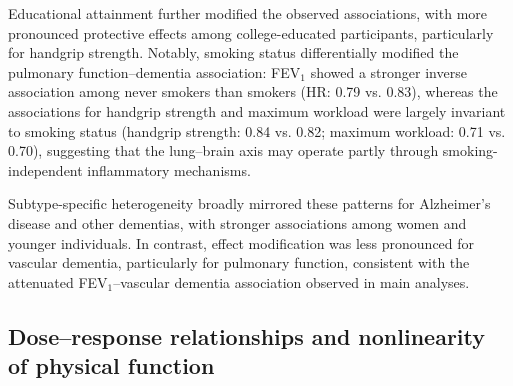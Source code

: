 \documentclass{article}
\begin{document}
Educational attainment further modified the observed associations, with more pronounced protective effects among college-educated participants, particularly for handgrip strength.
Notably, smoking status differentially modified the pulmonary function–dementia association: FEV$_1$ showed a stronger inverse association among never smokers than smokers (HR: 0.79 vs. 0.83), whereas the associations for handgrip strength and maximum workload were largely invariant to smoking status (handgrip strength: 0.84 vs. 0.82; maximum workload: 0.71 vs. 0.70), suggesting that the lung--brain axis may operate partly through smoking-independent inflammatory mechanisms.

Subtype-specific heterogeneity broadly mirrored these patterns for Alzheimer's disease and other dementias, with stronger associations among women and younger individuals.
In contrast, effect modification was less pronounced for vascular dementia, particularly for pulmonary function, consistent with the attenuated FEV$_1$–vascular dementia association observed in main analyses.


\subsection*{Dose--response relationships and nonlinearity of physical function}
\end{document}
